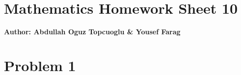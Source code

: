 \documentclass{article}
\begin{document}
\section*{\huge Mathematics Homework Sheet 10}
\begin{flushright}
   \textbf{Author: Abdullah Oguz Topcuoglu \& Yousef Farag}
\end{flushright}

\section*{Problem 1}
\end{document}
